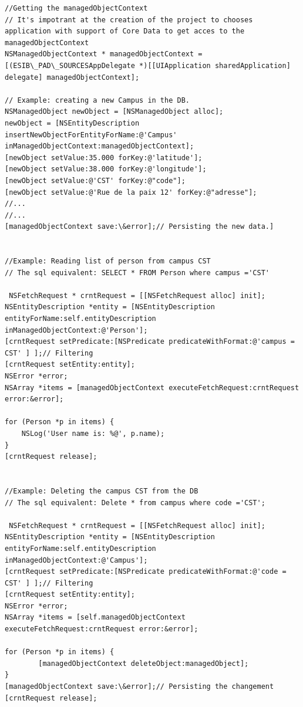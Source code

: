 \begin{lstlisting}[name=Create delete and read data, label=cd]
//Getting the managedObjectContext
// It's impotrant at the creation of the project to chooses application with support of Core Data to get acces to the  managedObjectContext  
NSManagedObjectContext * managedObjectContext =  [(ESIB\_PAD\_SOURCESAppDelegate *)[[UIApplication sharedApplication] delegate] managedObjectContext];

// Example: creating a new Campus in the DB.
NSManagedObject newObject = [NSManagedObject alloc];
newObject = [NSEntityDescription insertNewObjectForEntityForName:@'Campus' inManagedObjectContext:managedObjectContext];	
[newObject setValue:35.000 forKey:@'latitude'];
[newObject setValue:38.000 forKey:@'longitude'];
[newObject setValue:@'CST' forKey:@"code"];        
[newObject setValue:@'Rue de la paix 12' forKey:@"adresse"];
//... 
//...
[managedObjectContext save:\&error];// Persisting the new data.]


//Example: Reading list of person from campus CST
// The sql equivalent: SELECT * FROM Person where campus ='CST'

 NSFetchRequest * crntRequest = [[NSFetchRequest alloc] init];
NSEntityDescription *entity = [NSEntityDescription entityForName:self.entityDescription inManagedObjectContext:@'Person'];
[crntRequest setPredicate:[NSPredicate predicateWithFormat:@'campus = CST' ] ];// Filtering
[crntRequest setEntity:entity];
NSError *error;
NSArray *items = [managedObjectContext executeFetchRequest:crntRequest error:&error]; 

for (Person *p in items) {
    NSLog('User name is: %@', p.name);
}
[crntRequest release];


//Example: Deleting the campus CST from the DB
// The sql equivalent: Delete * from campus where code ='CST';

 NSFetchRequest * crntRequest = [[NSFetchRequest alloc] init];
NSEntityDescription *entity = [NSEntityDescription entityForName:self.entityDescription inManagedObjectContext:@'Campus'];
[crntRequest setPredicate:[NSPredicate predicateWithFormat:@'code = CST' ] ];// Filtering
[crntRequest setEntity:entity];
NSError *error;
NSArray *items = [self.managedObjectContext executeFetchRequest:crntRequest error:&error]; 

for (Person *p in items) {
        [managedObjectContext deleteObject:managedObject];
}
[managedObjectContext save:\&error];// Persisting the changement 
[crntRequest release];
\end{lstlisting}
	
